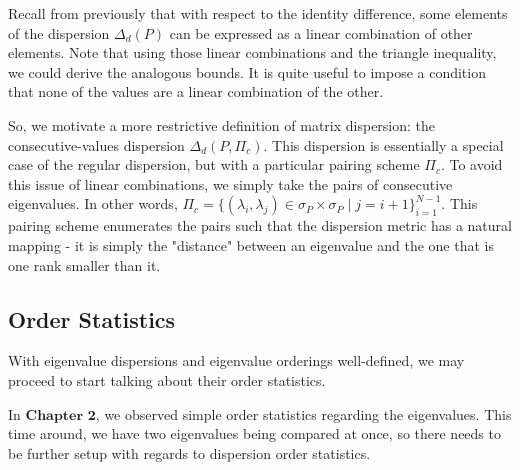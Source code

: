 
Recall from previously that with respect to the identity difference, some elements of the dispersion $\Delta_d(P)$ can be expressed as a linear combination of other elements. Note that using those linear combinations and the triangle inequality, we could derive the analogous bounds. It is quite useful to impose a condition that none of the values are a linear combination of the other.

So, we motivate a more restrictive definition of matrix dispersion: the consecutive-values dispersion $\Delta_d(P, \Pi_c)$. This dispersion is essentially a special case of the regular dispersion, but with a particular pairing scheme $\Pi_c$. To avoid this issue of linear combinations, we simply take the pairs of consecutive eigenvalues. In other words, $\Pi_c = \{(\lambda_i, \lambda_j) \in \sigma_P \times \sigma_P  \mid j = i+1\}_{i=1}^{N-1}$. This pairing scheme enumerates the pairs such that the dispersion metric has a natural mapping - it is simply the "distance" between an eigenvalue and the one that is one rank smaller than it.

%
%

\subsection{Order Statistics}
With eigenvalue dispersions and eigenvalue orderings well-defined, we may proceed to start talking about their order statistics.

In $\textbf{Chapter 2}$, we observed simple order statistics regarding the eigenvalues. This time around, we have two eigenvalues being compared at once, so there needs to be further setup with regards to dispersion order statistics.


